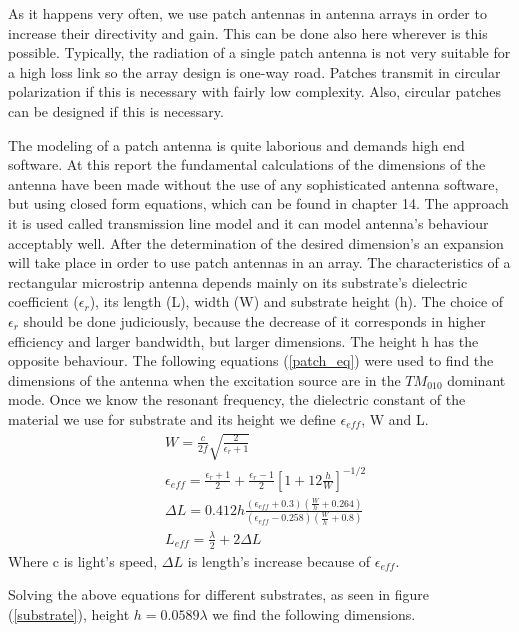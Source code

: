As it happens very often, we use patch antennas in antenna arrays in order to increase their directivity and gain. This can be done also here wherever is this possible. Typically, the radiation of a single patch antenna is not very suitable for a high loss link so the array design is one-way road. Patches transmit in circular polarization if this is necessary with fairly low complexity. Also, circular patches can be designed if this is necessary. 

The modeling of a patch antenna is quite laborious and demands high end software. At this report the fundamental calculations of the dimensions of the antenna have been made without the use of any sophisticated antenna software, but using closed form equations, which can be found in \cite{balanis} chapter 14. The approach it is used called transmission line model and it can model antenna's behaviour acceptably well. After the determination of the desired dimension's an expansion will take place in order to use patch antennas in an array.
The characteristics of a rectangular microstrip antenna depends mainly on its substrate's dielectric coefficient ($\epsilon_{r}$), its length (L), width (W) and substrate height (h). The choice of $\epsilon_{r}$ should be done judiciously, because the decrease of it corresponds in higher efficiency and larger bandwidth, but larger dimensions. The height h has the opposite behaviour. The following equations (\ref{patch_eq}) were used to find the dimensions of the antenna when the excitation source are in the $TM_{010}$ dominant mode. Once we know the resonant frequency, the dielectric constant of the material we use for substrate and its height we define $\epsilon_{eff}$, W and L.
\begin{subequations}
\begin{align}
   &W=\frac{c}{2f} \sqrt{\frac{2}{\epsilon_{r}+1}} \\
   &\epsilon_{eff}=\frac{\epsilon_{r}+1}{2}+\frac{\epsilon_{r}-1}{2}[1+12\frac{h}{W}]^{-1/2} \\
   &\Delta L=0.412 h \frac{(\epsilon_{eff}+0.3)(\frac{W}{h}+0.264)}{(\epsilon_{eff}-0.258)(\frac{W}{h}+0.8)} \\
   &L_{eff}=\frac{\lambda}{2}+2\Delta L
\end{align}
\label{patch_eq}
\end{subequations}
Where c is light's speed, $\Delta L$ is length's increase because of $\epsilon_{eff}$.

Solving the above equations for different substrates, as seen in figure (\ref{substrate}), height $h=0.0589 \lambda$ we find the following dimensions.

